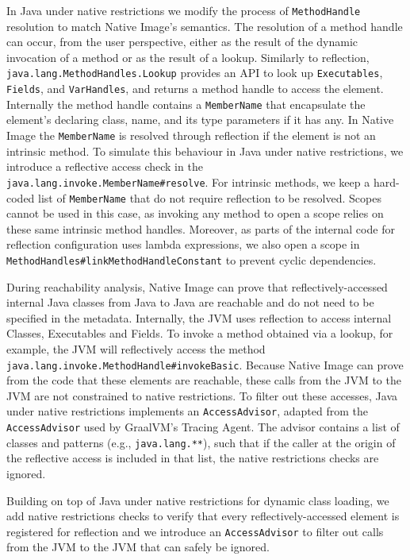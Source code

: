 In Java under native restrictions we modify the process of \verb|MethodHandle| resolution to match Native Image's semantics.
The resolution of a method handle can occur, from the user perspective, either as the result of the dynamic invocation of a method or as the result of a lookup.
Similarly to reflection, \verb|java.lang.MethodHandles.Lookup| provides an API to look up \verb|Executables|, \verb|Fields|, and \verb|VarHandles|, and returns a method handle to access the element. Internally the method handle contains a \verb|MemberName| that encapsulate the element's declaring class, name, and its type parameters if it has any. 
In Native Image the \verb|MemberName| is resolved through reflection if the element is not an intrinsic method. To simulate this behaviour in Java under native restrictions, we introduce a reflective access check in the \verb|java.lang.invoke.MemberName#resolve|. 
For intrinsic methods, we keep a hard-coded list of \verb|MemberName| that do not require reflection to be resolved. Scopes cannot be used in this case, as invoking any method to open a scope relies on these same intrinsic method handles.
Moreover, as parts of the internal code for reflection configuration uses lambda expressions, we also open a scope in \verb|MethodHandles#linkMethodHandleConstant| to prevent cyclic dependencies.

During reachability analysis, Native Image can prove that reflectively-accessed internal Java classes from Java to Java are reachable and do not need to be specified in the metadata. Internally, the JVM uses reflection to access internal Classes, Executables and Fields. To invoke a method obtained via a lookup, for example, the JVM will reflectively access the method \verb|java.lang.invoke.MethodHandle#invokeBasic|. Because Native Image can prove from the code that these elements are reachable, these calls from the JVM to the JVM are not constrained to native restrictions. To filter out these accesses, Java under native restrictions implements an \verb|AccessAdvisor|, adapted from the \verb|AccessAdvisor| used by GraalVM's Tracing Agent. The advisor contains a list of classes and patterns (e.g., \verb|java.lang.**|), such that if the caller at the origin of the reflective access is included in that list, the native restrictions checks are ignored.

Building on top of Java under native restrictions for dynamic class loading, we add native restrictions checks to verify that every reflectively-accessed element is registered for reflection and we introduce an \verb|AccessAdvisor| to filter out calls from the JVM to the JVM that can safely be ignored.

